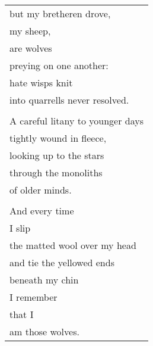 \documentclass{article}
\begin{document}
\begin{center}
\begin{tabular}{l}
but my bretheren drove, \\
my sheep, \\
are wolves \\
preying on one another: \\
hate wisps knit \\
into quarrells never resolved. \\
\\
A careful litany to younger days \\
tightly wound in fleece, \\
looking up to the stars \\
through the monoliths \\
of older minds. \\
\\
And every time \\
I slip \\
the matted wool over my head \\
and tie the yellowed ends \\
beneath my chin \\
I remember \\
that I \\
am those wolves. \\
\end{tabular}
\end{center}
\end{document}
